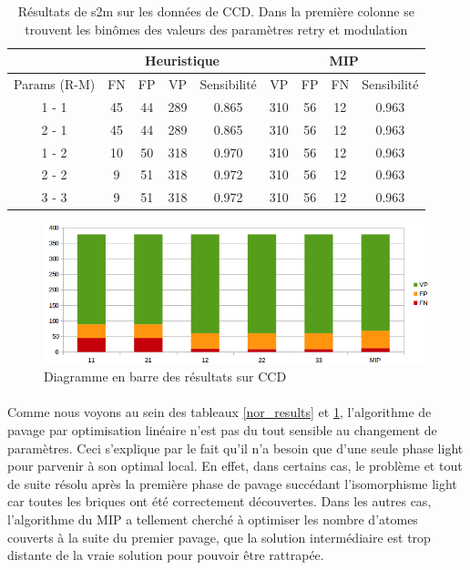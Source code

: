 \documentclass[12pt,french,twoside]{report}
\begin{document}
\begin{table}[!ht]
  \centering
  \begin{tabular}{|c|c|c|c|c|c|c|c|c|}
    \hline
    & \multicolumn{4}{c|}{Heuristique} & \multicolumn{4}{c|}{MIP} \\
    \hline
    Params (R-M) & FN & FP & VP & Sensibilité & VP & FP & FN & Sensibilité \\
    \hline
    1 - 1 & 45 & 44 & 289 & 0.865 & 310 & 56 & 12 & 0.963 \\
    \hline
    2 - 1 & 45 & 44 & 289 & 0.865 & 310 & 56 & 12 & 0.963 \\
    \hline
    1 - 2 & 10 & 50 & 318 & 0.970 & 310 & 56 & 12 & 0.963 \\
    \hline
    2 - 2 & 9 & 51 & 318 & 0.972 & 310 & 56 & 12 & 0.963 \\
    \hline
    3 - 3 & 9 & 51 & 318 & 0.972 & 310 & 56 & 12 & 0.963 \\
    \hline
  \end{tabular}
  \caption{\label{ccd_results}Résultats de s2m sur les données de CCD.
  Dans la première colonne se trouvent les binômes des valeurs des paramètres retry et modulation}
\end{table}

\begin{figure}[!ht]
  \begin{center}
    \includegraphics[width=450px]{Figures/s2m/results/CCD.png}
    \caption{\label{ccd_graph}Diagramme en barre des résultats sur CCD}
  \end{center}
\end{figure}


\paragraph{}Comme nous voyons au sein des tableaux \ref{nor_results} et \ref{ccd_results}, l'algorithme de pavage par optimisation linéaire n'est pas du tout sensible au changement de paramètres.
Ceci s'explique par le fait qu'il n'a besoin que d'une seule phase light pour parvenir à son optimal local.
En effet, dans certains cas, le problème et tout de suite résolu après la première phase de pavage succédant l'isomorphisme light car toutes les briques ont été correctement découvertes.
Dans les autres cas, l'algorithme du MIP a tellement cherché à optimiser les nombre d'atomes couverts à la suite du premier pavage, que la solution intermédiaire est trop distante de la vraie solution pour pouvoir être rattrapée.
\end{document}
